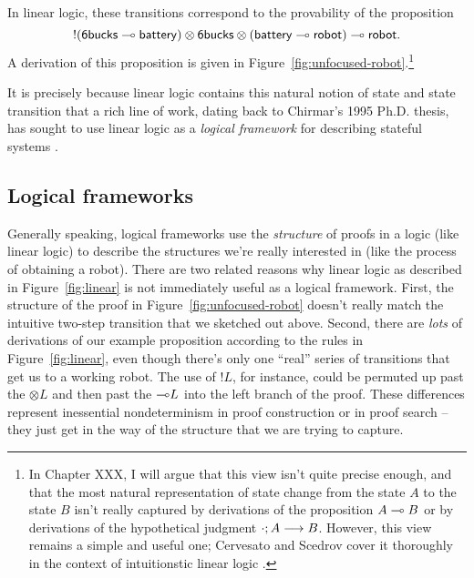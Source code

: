 In linear logic, these transitions correspond to the provability
of the proposition
\[{!}({\sf 6bucks} \multimap {\sf battery}) \otimes {\sf 6bucks} \otimes
({\sf battery} \multimap {\sf robot}) \multimap {\sf robot}.\] 
A derivation of this proposition is given in
Figure~\ref{fig:unfocused-robot}.\footnote{In Chapter XXX, I will
  argue that this view isn't quite precise enough, and that the most
  natural representation of state change from the state $A$ to the
  state $B$ isn't really captured by derivations of the proposition $A
  \multimap B$ or by derivations of the hypothetical judgment
  ${\cdot};{A} \longrightarrow {B} \mathstrut$.  However, this view remains a simple and useful
  one; Cervesato and Scedrov cover it thoroughly in the context of
  intuitionstic linear logic \cite{cervesato09relating}.}  



It is precisely because linear logic contains this natural notion of
state and state transition that a rich line of work, dating back to
Chirmar's 1995 Ph.D. thesis, has sought to use linear logic as a {\it
  logical framework} for describing stateful systems
\cite{chirimar95proof,cervesato02linear,
  cervesato02concurrent,pfenning04substructural,miller09formalizing,
  pfenning09substructural,cervesato09relating}.  

\subsection*{Logical frameworks}

Generally speaking, logical frameworks use the {\it structure} of
proofs in a logic (like linear logic) to describe the structures we're
really interested in (like the process of obtaining a robot).  There
are two related reasons why linear logic as described in
Figure~\ref{fig:linear} is not immediately useful as a logical
framework. First, the structure of the proof in
Figure~\ref{fig:unfocused-robot} doesn't really match the intuitive
two-step transition that we sketched out above. Second, there are {\it
  lots} of derivations of our example proposition according to the
rules in Figure~\ref{fig:linear}, even though there's only one
``real'' series of transitions that get us to a working robot. The use
of ${!}L$, for instance, could be permuted up past the ${\otimes}L$
and then past the ${\multimap}L$ into the left branch of the proof. These
differences represent inessential nondeterminism in proof construction
or in proof search -- they just get in the way of the structure that
we are trying to capture. 

